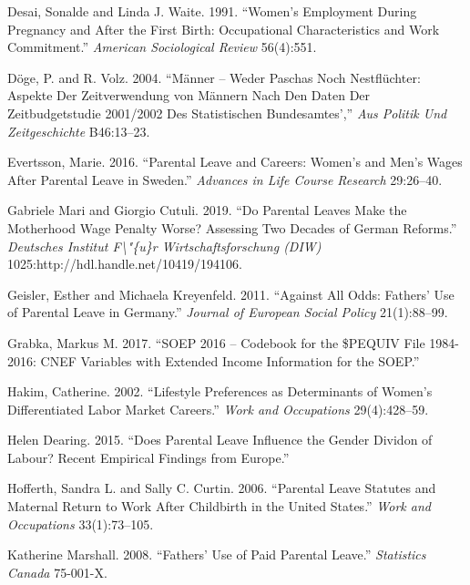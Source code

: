 \documentclass[
  12pt,
]{article}
\begin{document}
\leavevmode\hypertarget{ref-desai_womens_1991}{}%
Desai, Sonalde and Linda J. Waite. 1991. ``Women's Employment During Pregnancy and After the First Birth: Occupational Characteristics and Work Commitment.'' \emph{American Sociological Review} 56(4):551.

\leavevmode\hypertarget{ref-doge_manner_2004}{}%
Döge, P. and R. Volz. 2004. ``Männer -- Weder Paschas Noch Nestflüchter: Aspekte Der Zeitverwendung von Männern Nach Den Daten Der Zeitbudgetstudie 2001/2002 Des Statistischen Bundesamtes','' \emph{Aus Politik Und Zeitgeschichte} B46:13--23.

\leavevmode\hypertarget{ref-evertsson_parental_2016}{}%
Evertsson, Marie. 2016. ``Parental Leave and Careers: Women's and Men's Wages After Parental Leave in Sweden.'' \emph{Advances in Life Course Research} 29:26--40.

\leavevmode\hypertarget{ref-gabriele_mari_parental_2019}{}%
Gabriele Mari and Giorgio Cutuli. 2019. ``Do Parental Leaves Make the Motherhood Wage Penalty Worse? Assessing Two Decades of German Reforms.'' \emph{Deutsches Institut F\textbackslash"\{u\}r Wirtschaftsforschung (DIW)} 1025:http://hdl.handle.net/10419/194106.

\leavevmode\hypertarget{ref-geisler_against_2011}{}%
Geisler, Esther and Michaela Kreyenfeld. 2011. ``Against All Odds: Fathers' Use of Parental Leave in Germany.'' \emph{Journal of European Social Policy} 21(1):88--99.

\leavevmode\hypertarget{ref-grabka_soep_2017}{}%
Grabka, Markus M. 2017. ``SOEP 2016 -- Codebook for the \$PEQUIV File 1984-2016: CNEF Variables with Extended Income Information for the SOEP.''

\leavevmode\hypertarget{ref-hakim_lifestyle_2002}{}%
Hakim, Catherine. 2002. ``Lifestyle Preferences as Determinants of Women's Differentiated Labor Market Careers.'' \emph{Work and Occupations} 29(4):428--59.

\leavevmode\hypertarget{ref-helen_dearing_does_2015}{}%
Helen Dearing. 2015. ``Does Parental Leave Influence the Gender Dividon of Labour? Recent Empirical Findings from Europe.''

\leavevmode\hypertarget{ref-hofferth_parental_2006}{}%
Hofferth, Sandra L. and Sally C. Curtin. 2006. ``Parental Leave Statutes and Maternal Return to Work After Childbirth in the United States.'' \emph{Work and Occupations} 33(1):73--105.

\leavevmode\hypertarget{ref-katherine_marshall_fathers_2008}{}%
Katherine Marshall. 2008. ``Fathers' Use of Paid Parental Leave.'' \emph{Statistics Canada} 75-001-X.
\end{document}
